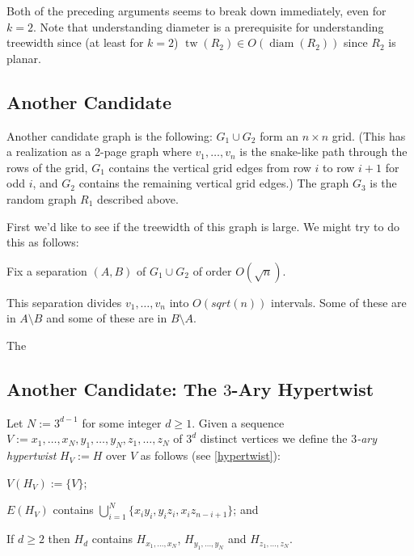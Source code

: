 \documentclass{patmorin}
\DeclareMathOperator{\diam}{diam}
\DeclareMathOperator{\tw}{tw}
\begin{document}
Both of the preceding arguments seems to break down immediately, even for $k=2$.  Note that understanding diameter is a prerequisite for understanding treewidth since (at least for $k=2$) $\tw(R_2) \in O(\diam(R_2))$ since $R_2$ is planar.


\subsection{Another Candidate}

Another candidate graph is the following: $G_1\cup G_2$ form an $n\times n$ grid.  (This has a realization as a 2-page graph where $v_1,\ldots,v_n$ is the snake-like path through the rows of the grid, $G_1$ contains the vertical grid edges from row $i$ to row $i+1$ for odd $i$, and $G_2$ contains the remaining vertical grid edges.)  The graph $G_3$ is the random graph $R_1$ described above.

First we'd like to see if the treewidth of this graph is large.  We might try to do this as follows:
\begin{compactenum}
    \item Fix a separation $(A,B)$ of $G_1\cup G_2$ of order $O(\sqrt{n})$.
    \item This separation divides $v_1,\ldots,v_n$ into $O(sqrt(n))$ intervals.  Some of these are in $A\setminus B$ and some of these are in $B\setminus A$.
    \item The
\end{compactenum}


\subsection{Another Candidate: The $3$-Ary Hypertwist}

Let $N:=3^{d-1}$ for some integer $d\ge 1$.  Given a sequence $V:=x_1,\ldots,x_{N},y_1,\ldots,y_N,z_1,\ldots,z_N$ of $3^d$ distinct vertices we define the \emph{$3$-ary hypertwist} $H_V:=H$ over $V$ as follows (see \cref{hypertwist}):
\begin{compactenum}
    \item $V(H_V):=\{V\}$;
    \item $E(H_V)$ contains $\bigcup_{i=1}^N\{x_iy_i, y_iz_i, x_iz_{n-i+1}\}$; and
    \item If $d \ge 2$ then $H_d$ contains $H_{x_1,\ldots,x_N}$, $H_{y_1,\ldots,y_N}$ and $H_{z_1,\ldots,z_N}$.
\end{compactenum}
\end{document}
